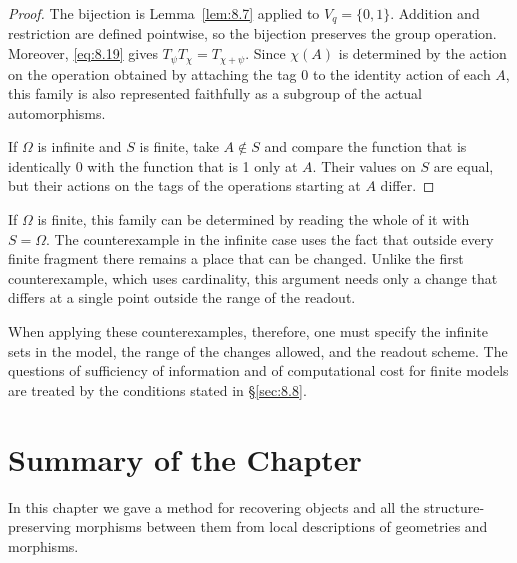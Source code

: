 \begin{proof}

The bijection is Lemma~\ref{lem:8.7} applied to $V_q=\{0,1\}$.
Addition and restriction are defined pointwise, so the bijection preserves the group
operation.
Moreover, \eqref{eq:8.19} gives $T_\psi T_\chi=T_{\chi+\psi}$.
Since $\chi(A)$ is determined by the action on the operation obtained by attaching the tag 0
to the identity action of each $A$, this family is also represented faithfully as a subgroup of
the actual automorphisms.

If $\Omega$ is infinite and $S$ is finite, take $A\notin S$ and compare the function that is
identically 0 with the function that is 1 only at $A$.
Their values on $S$ are equal, but their actions on the tags of the operations starting at $A$
differ.

\end{proof}

If $\Omega$ is finite, this family can be determined by reading the whole of it with
$S=\Omega$.
The counterexample in the infinite case uses the fact that outside every finite fragment there
remains a place that can be changed.
Unlike the first counterexample, which uses cardinality, this argument needs only a change that
differs at a single point outside the range of the readout.

When applying these counterexamples, therefore, one must specify the infinite sets in the
model, the range of the changes allowed, and the readout scheme.
The questions of sufficiency of information and of computational cost for finite models are
treated by the conditions stated in \S\ref{sec:8.8}.

\section*{Summary of the Chapter}

In this chapter we gave a method for recovering objects and all the structure-preserving
morphisms between them from local descriptions of geometries and morphisms.

